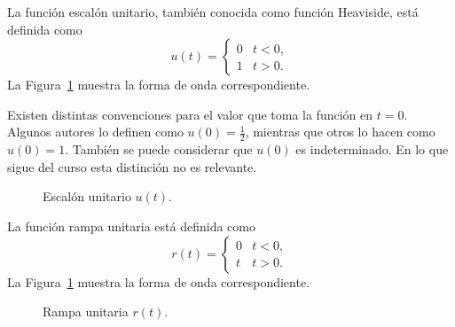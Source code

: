 \documentclass[paper=letter, fontsize=11pt]{scrartcl}
\begin{document}
\begin{defi} La función escalón unitario, también conocida
  como función Heaviside, está definida como
  \begin{equation}
    u(t) =
    \begin{cases}
       0 & t < 0, \\
       1 & t > 0.
    \end{cases}
  \end{equation}
  La Figura~\ref{fig:step} muestra la forma de onda correspondiente.
\end{defi}

Existen distintas convenciones para el valor que toma la función en
$t=0$. Algunos autores lo definen como $u(0) = \frac{1}{2}$, mientras que otros
lo hacen como $u(0)=1$. También se puede considerar que $u(0)$ es
indeterminado. En lo que sigue del curso esta distinción no es relevante.

\begin{figure}[h!]
  \centering
  \caption{Escalón unitario $u(t)$.}
\label{fig:step}
\end{figure}

\begin{defi} La función rampa unitaria está definida como
  \begin{equation}
    r(t) =
    \begin{cases}
       0 & t < 0, \\
       t & t > 0.
    \end{cases}
  \end{equation}
  La Figura~\ref{fig:step} muestra la forma de onda correspondiente.
\end{defi}

\begin{figure}[h!]
  \centering
  \caption{Rampa unitaria $r(t)$.}
\label{fig:rampa}
\end{figure}
\end{document}
